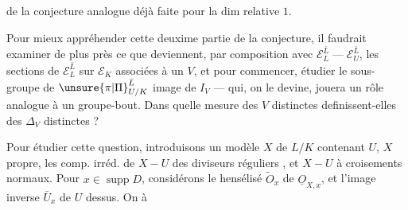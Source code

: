 de la conjecture analogue déjà faite pour la dim relative $1$.

Pour mieux appréhender cette deuxime partie  de la conjecture, il faudrait examiner de plus près ce que deviennent, par composition avec $\mathcal E_L^{\bar L}\mathrel{\text{---}}\mathcal E_U^{\bar L}$, les sections de $\mathcal E_L^{\bar L}$ sur $\mathcal E_K$ associées à un $V$, et pour commencer, étudier le sous-groupe  de $\unsure{\pi|\Pi}_{U/K}^{\bar L}$ image de $I_V$ --- qui, on le devine, jouera un rôle analogue à un groupe-bout. Dans quelle mesure des $V$ distinctes definissent-elles des $\Delta_V$ distinctes ?

Pour étudier cette question, introduisons un modèle $X$ de $L/K$ contenant $U$, $X$ propre, les comp. irréd. de  $X-U$ des diviseurs réguliers , et $X-U$ à croisements normaux. Pour $x\in\operatorname{supp}D$, considérons le hensélisé  $\tilde O_x$ de $\underline{O}_{X,x}$, et l'image inverse $\bar U_x$ de $U$ dessus. On à

